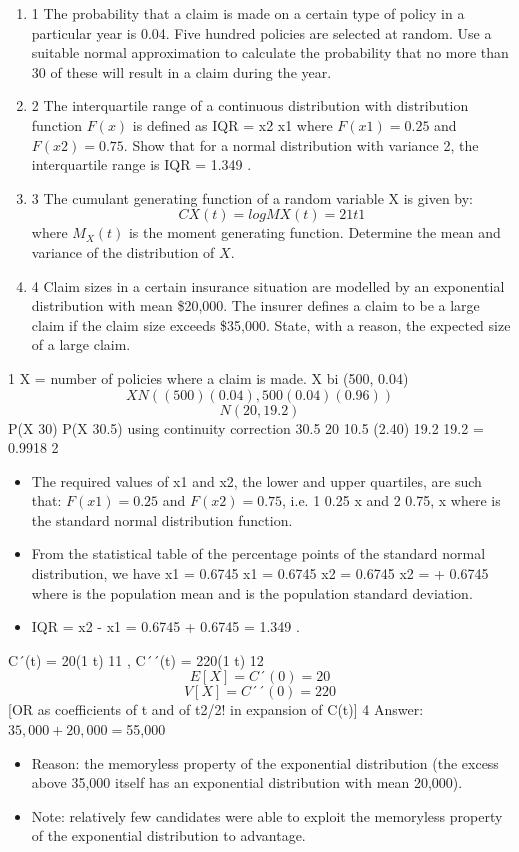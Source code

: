 \documentclass[a4paper,12pt]{article}
\begin{document}
\begin{enumerate}
\item
1 The probability that a claim is made on a certain type of policy in a particular year is
0.04. Five hundred policies are selected at random.
Use a suitable normal approximation to calculate the probability that no more than 30
of these will result in a claim during the year. 
\item 2 The interquartile range of a continuous distribution with distribution function $F(x)$ is
defined as IQR = x2 x1 where $F(x1) = 0.25$ and $F(x2) = 0.75$.
Show that for a normal distribution with variance 2, the interquartile range is
IQR = 1.349 . 
\item 3 The cumulant generating function of a random variable X is given by:
 \[CX (t) = logMX (t) = 2 1 t 1\]
where $M_X(t)$ is the moment generating function.
Determine the mean and variance of the distribution of $X$. 
\item 4 Claim sizes in a certain insurance situation are modelled by an exponential
distribution with mean \$20,000. The insurer defines a claim to be a large claim if the
claim size exceeds \$35,000.
State, with a reason, the expected size of a large claim. 
\end{enumerate}
\newpage

1 X = number of policies where a claim is made.
X bi (500, 0.04)
\[X N((500)(0.04), 500(0.04)(0.96))\] \[N(20, 19.2)\]
P(X 30) P(X 30.5) using continuity correction
30.5 20 10.5
(2.40)
19.2 19.2
= 0.9918
2 
\begin{itemize}
    \item The required values of x1 and x2, the lower and upper quartiles, are such that:
$F(x1) = 0.25$ and $F(x2) = 0.75$,
i.e. 1 0.25
x
and 2 0.75,
x
where is the standard normal distribution function.
\item From the statistical table of the percentage points of the standard normal distribution,
we have
x1
= 0.6745 x1 = 0.6745
x2
= 0.6745 x2 = + 0.6745
where is the population mean and is the population standard deviation.
\item IQR = x2 - x1
= 0.6745 + 0.6745
= 1.349 .
\end{itemize}
 C´(t) = 20(1 t) 11 , C´´(t) = 220(1 t) 12
\[E[X] = C´(0) = 20\]
\[V[X] = C´´(0) = 220\]
[OR as coefficients of t and of t2/2! in expansion of C(t)]
4 Answer: $35,000 + 20,000 = $55,000
\begin{itemize}
    \item Reason: the memoryless property of the exponential distribution (the excess above
35,000 itself has an exponential distribution with mean 20,000).
\item Note: relatively few candidates were able to exploit the memoryless property of the
exponential distribution to advantage.
\end{itemize}
\end{document}
